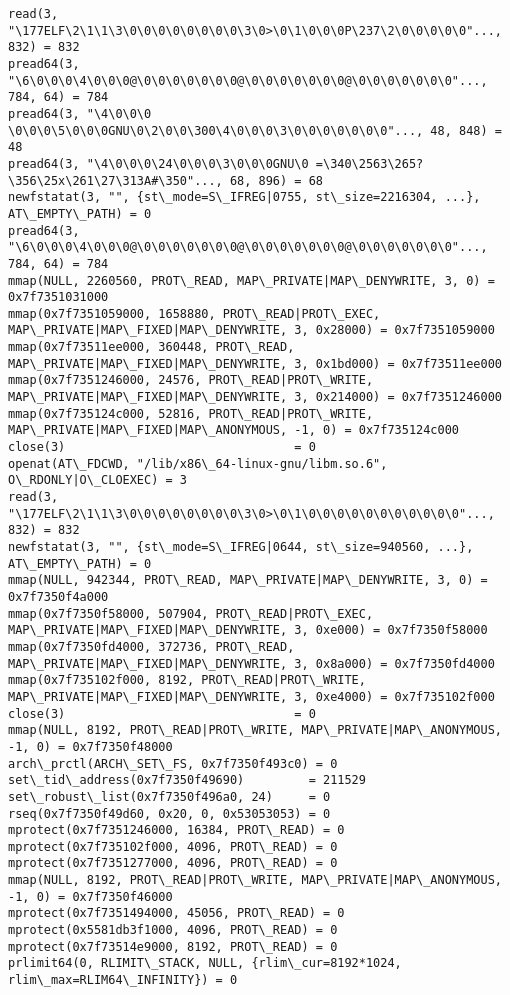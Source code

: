 \documentclass[a4paper, 12pt]{article}
\begin{document}
\begin{lstlisting}
read(3, "\177ELF\2\1\1\3\0\0\0\0\0\0\0\0\3\0>\0\1\0\0\0P\237\2\0\0\0\0\0"..., 832) = 832
pread64(3, "\6\0\0\0\4\0\0\0@\0\0\0\0\0\0\0@\0\0\0\0\0\0\0@\0\0\0\0\0\0\0"..., 784, 64) = 784
pread64(3, "\4\0\0\0 \0\0\0\5\0\0\0GNU\0\2\0\0\300\4\0\0\0\3\0\0\0\0\0\0\0"..., 48, 848) = 48
pread64(3, "\4\0\0\0\24\0\0\0\3\0\0\0GNU\0 =\340\2563\265?\356\25x\261\27\313A#\350"..., 68, 896) = 68
newfstatat(3, "", {st\_mode=S\_IFREG|0755, st\_size=2216304, ...}, AT\_EMPTY\_PATH) = 0
pread64(3, "\6\0\0\0\4\0\0\0@\0\0\0\0\0\0\0@\0\0\0\0\0\0\0@\0\0\0\0\0\0\0"..., 784, 64) = 784
mmap(NULL, 2260560, PROT\_READ, MAP\_PRIVATE|MAP\_DENYWRITE, 3, 0) = 0x7f7351031000
mmap(0x7f7351059000, 1658880, PROT\_READ|PROT\_EXEC, MAP\_PRIVATE|MAP\_FIXED|MAP\_DENYWRITE, 3, 0x28000) = 0x7f7351059000
mmap(0x7f73511ee000, 360448, PROT\_READ, MAP\_PRIVATE|MAP\_FIXED|MAP\_DENYWRITE, 3, 0x1bd000) = 0x7f73511ee000
mmap(0x7f7351246000, 24576, PROT\_READ|PROT\_WRITE, MAP\_PRIVATE|MAP\_FIXED|MAP\_DENYWRITE, 3, 0x214000) = 0x7f7351246000
mmap(0x7f735124c000, 52816, PROT\_READ|PROT\_WRITE, MAP\_PRIVATE|MAP\_FIXED|MAP\_ANONYMOUS, -1, 0) = 0x7f735124c000
close(3)                                = 0
openat(AT\_FDCWD, "/lib/x86\_64-linux-gnu/libm.so.6", O\_RDONLY|O\_CLOEXEC) = 3
read(3, "\177ELF\2\1\1\3\0\0\0\0\0\0\0\0\3\0>\0\1\0\0\0\0\0\0\0\0\0\0\0"..., 832) = 832
newfstatat(3, "", {st\_mode=S\_IFREG|0644, st\_size=940560, ...}, AT\_EMPTY\_PATH) = 0
mmap(NULL, 942344, PROT\_READ, MAP\_PRIVATE|MAP\_DENYWRITE, 3, 0) = 0x7f7350f4a000
mmap(0x7f7350f58000, 507904, PROT\_READ|PROT\_EXEC, MAP\_PRIVATE|MAP\_FIXED|MAP\_DENYWRITE, 3, 0xe000) = 0x7f7350f58000
mmap(0x7f7350fd4000, 372736, PROT\_READ, MAP\_PRIVATE|MAP\_FIXED|MAP\_DENYWRITE, 3, 0x8a000) = 0x7f7350fd4000
mmap(0x7f735102f000, 8192, PROT\_READ|PROT\_WRITE, MAP\_PRIVATE|MAP\_FIXED|MAP\_DENYWRITE, 3, 0xe4000) = 0x7f735102f000
close(3)                                = 0
mmap(NULL, 8192, PROT\_READ|PROT\_WRITE, MAP\_PRIVATE|MAP\_ANONYMOUS, -1, 0) = 0x7f7350f48000
arch\_prctl(ARCH\_SET\_FS, 0x7f7350f493c0) = 0
set\_tid\_address(0x7f7350f49690)         = 211529
set\_robust\_list(0x7f7350f496a0, 24)     = 0
rseq(0x7f7350f49d60, 0x20, 0, 0x53053053) = 0
mprotect(0x7f7351246000, 16384, PROT\_READ) = 0
mprotect(0x7f735102f000, 4096, PROT\_READ) = 0
mprotect(0x7f7351277000, 4096, PROT\_READ) = 0
mmap(NULL, 8192, PROT\_READ|PROT\_WRITE, MAP\_PRIVATE|MAP\_ANONYMOUS, -1, 0) = 0x7f7350f46000
mprotect(0x7f7351494000, 45056, PROT\_READ) = 0
mprotect(0x5581db3f1000, 4096, PROT\_READ) = 0
mprotect(0x7f73514e9000, 8192, PROT\_READ) = 0
prlimit64(0, RLIMIT\_STACK, NULL, {rlim\_cur=8192*1024, rlim\_max=RLIM64\_INFINITY}) = 0

\end{lstlisting}
\end{document}
